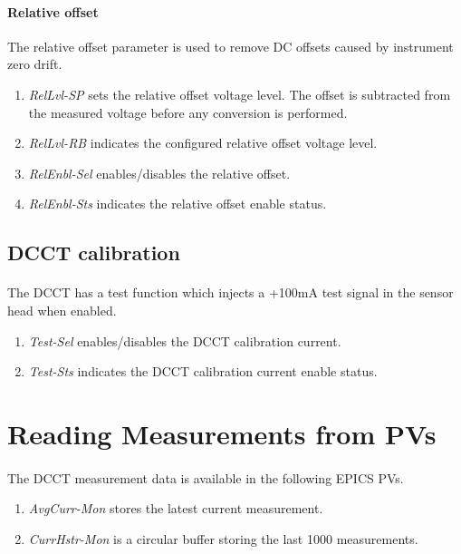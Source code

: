 \documentclass[openany]{article}
\begin{document}
		\paragraph{Relative offset} The relative offset parameter is used to remove DC offsets caused by instrument zero drift.

			\begin{enumerate}
			\item \emph{RelLvl-SP} sets the relative offset voltage level. The offset is subtracted from the measured voltage before any conversion is performed.
			\item \emph{RelLvl-RB} indicates the configured relative offset voltage level.
			\item \emph{RelEnbl-Sel} enables/disables the relative offset.
			\item \emph{RelEnbl-Sts} indicates the relative offset enable status.
			\end{enumerate}

	\subsection{DCCT calibration}

		\paragraph{} The DCCT has a test function which injects a +100mA test signal in the sensor head when enabled.

			\begin{enumerate}
			\item \emph{Test-Sel} enables/disables the DCCT calibration current.
			\item \emph{Test-Sts} indicates the DCCT calibration current enable status.
			\end{enumerate}

\section{Reading Measurements from PVs}

	\paragraph{} The DCCT measurement data is available in the following EPICS PVs.

		\begin{enumerate}
		\item \emph{AvgCurr-Mon} stores the latest current measurement.
		\item \emph{CurrHstr-Mon} is a circular buffer storing the last 1000 measurements.
		\end{enumerate}
\end{document}
